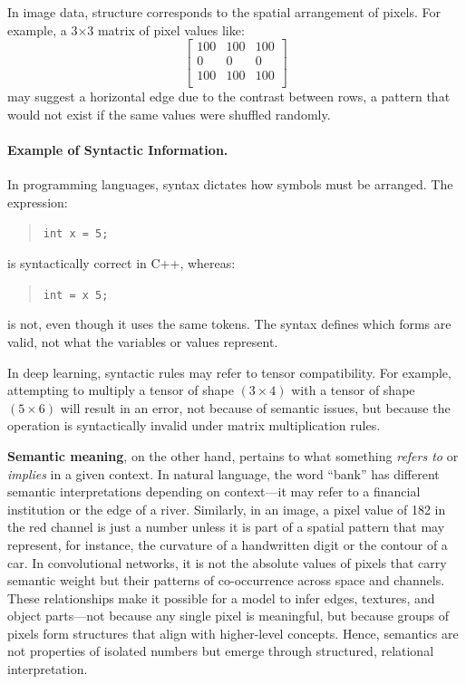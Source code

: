 In image data, structure corresponds to the spatial arrangement of pixels. For example, a 3$\times$3 matrix of pixel values like:
\[
\begin{bmatrix}
	100 & 100 & 100 \\
	0 & 0 & 0 \\
	100 & 100 & 100 \\
\end{bmatrix}
\]
may suggest a horizontal edge due to the contrast between rows, a pattern that would not exist if the same values were shuffled randomly.

\paragraph{Example of Syntactic Information.}
In programming languages, syntax dictates how symbols must be arranged. The expression:
\begin{quote}
	\texttt{int x = 5;}
\end{quote}
is syntactically correct in C++, whereas:
\begin{quote}
	\texttt{int = x 5;}
\end{quote}
is not, even though it uses the same tokens. The syntax defines which forms are valid, not what the variables or values represent.

In deep learning, syntactic rules may refer to tensor compatibility. For example, attempting to multiply a tensor of shape $(3 \times 4)$ with a tensor of shape $(5 \times 6)$ will result in an error, not because of semantic issues, but because the operation is syntactically invalid under matrix multiplication rules.


\textbf{Semantic meaning}, on the other hand, pertains to what something \emph{refers to} or \emph{implies} in a given context. In natural language, the word “bank” has different semantic interpretations depending on context—it may refer to a financial institution or the edge of a river. Similarly, in an image, a pixel value of 182 in the red channel is just a number unless it is part of a spatial pattern that may represent, for instance, the curvature of a handwritten digit or the contour of a car. In convolutional networks, it is not the absolute values of pixels that carry semantic weight but their patterns of co-occurrence across space and channels. These relationships make it possible for a model to infer edges, textures, and object parts—not because any single pixel is meaningful, but because groups of pixels form structures that align with higher-level concepts. Hence, semantics are not properties of isolated numbers but emerge through structured, relational interpretation.

